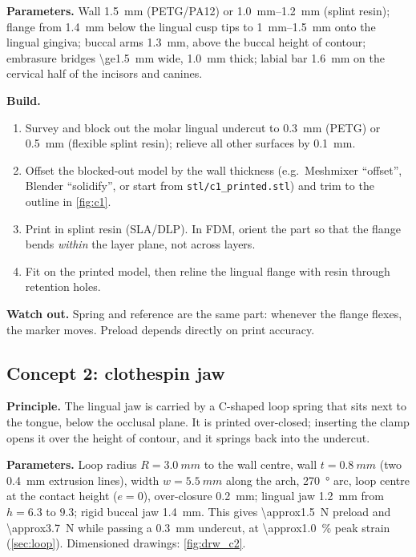 \textbf{Parameters.} Wall \SI{1.5}{mm} (PETG/PA12) or \SIrange{1.0}{1.2}{mm} (splint resin);
flange from \SI{1.4}{mm} below the lingual cusp tips to \SIrange{1}{1.5}{mm} onto the lingual
gingiva; buccal arms \SI{1.3}{mm}, above the buccal height of contour; embrasure bridges
\SI{\ge1.5}{mm} wide, \SI{1.0}{mm} thick; labial bar \SI{1.6}{mm} on the cervical half of the
incisors and canines.

\textbf{Build.}
\begin{enumerate}
\item Survey and block out the molar lingual undercut to \SI{0.3}{mm} (PETG) or
\SI{0.5}{mm} (flexible splint resin); relieve all other surfaces by \SI{0.1}{mm}.
\item Offset the blocked-out model by the wall thickness (e.g.\ Meshmixer ``offset'', Blender
``solidify'', or start from \texttt{stl/c1\_printed.stl}) and trim to the outline in \cref{fig:c1}.
\item Print in splint resin (SLA/DLP). In FDM, orient the part so that the flange bends
\emph{within} the layer plane, not across layers.
\item Fit on the printed model, then reline the lingual flange with resin through retention holes.
\end{enumerate}
\textbf{Watch out.} Spring and reference are the same part: whenever the flange flexes, the marker
moves. Preload depends directly on print accuracy.

\subsection{Concept 2: clothespin jaw}
\textbf{Principle.} The lingual jaw is carried by a C-shaped loop spring that sits next to the
tongue, below the occlusal plane. It is printed over-closed; inserting the clamp opens it over the
height of contour, and it springs back into the undercut.

\textbf{Parameters.} Loop radius $R=\SI{3.0}{mm}$ to the wall centre, wall $t=\SI{0.8}{mm}$ (two
\SI{0.4}{mm} extrusion lines), width $w=\SI{5.5}{mm}$ along the arch, \SI{270}{\degree} arc,
loop centre at the contact height ($e=0$), over-closure \SI{0.2}{mm}; lingual jaw \SI{1.2}{mm} from
$h=6.3$ to $9.3$; rigid buccal jaw \SI{1.4}{mm}. This gives \SI{\approx1.5}{N} preload and
\SI{\approx3.7}{N} while passing a \SI{0.3}{mm} undercut, at \SI{\approx1.0}{\percent} peak strain
(\cref{sec:loop}). Dimensioned drawings: \cref{fig:drw_c2}.


